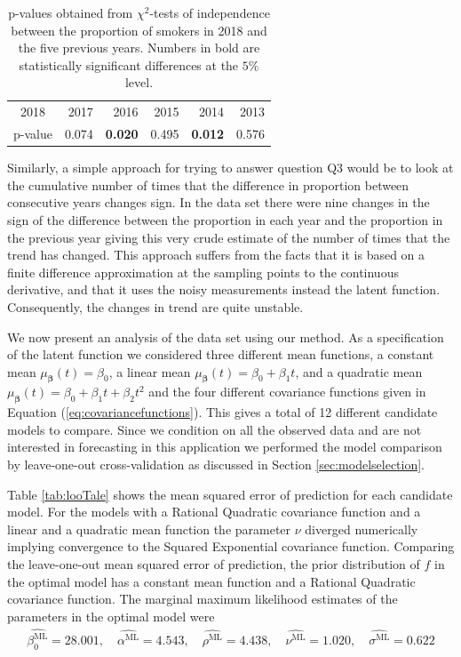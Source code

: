 \documentclass[
  11pt,
]{article}
\theoremstyle{nonumberplain}
\begin{document}
\begin{table}[htbp]
\center
\begin{tabular}{c|rrrrr} \hline
2018 & 2017 & 2016 & 2015 & 2014 & 2013\\ 
p-value & 0.074 & \textbf{0.020} & 0.495 & \textbf{0.012} & 0.576\\ \hline
\end{tabular}
\caption{p-values obtained from $\chi^2$-tests of independence between the proportion of smokers in 2018 and the five previous years. Numbers in bold are statistically significant differences at the $5\%$ level.}
\label{tab:chisqtests}
\end{table}

Similarly, a simple approach for trying to answer question Q3 would be
to look at the cumulative number of times that the difference in
proportion between consecutive years changes sign. In the data set there
were nine changes in the sign of the difference between the proportion
in each year and the proportion in the previous year giving this very
crude estimate of the number of times that the trend has changed. This
approach suffers from the facts that it is based on a finite difference
approximation at the sampling points to the continuous derivative, and
that it uses the noisy measurements instead the latent function.
Consequently, the changes in trend are quite unstable.

We now present an analysis of the data set using our method. As a
specification of the latent function we considered three different mean
functions, a constant mean \(\mu_{\bm{\beta}}(t) = \beta_0\), a linear
mean \(\mu_{\bm{\beta}}(t) = \beta_0 + \beta_1 t\), and a quadratic mean
\(\mu_{\bm{\beta}}(t) = \beta_0 + \beta_1 t + \beta_2 t^2\) and the four
different covariance functions given in Equation
(\ref{eq:covariancefunctions}). This gives a total of 12 different
candidate models to compare. Since we condition on all the observed data
and are not interested in forecasting in this application we performed
the model comparison by leave-one-out cross-validation as discussed in
Section \ref{sec:modelselection}.

Table \ref{tab:looTale} shows the mean squared error of prediction for
each candidate model. For the models with a Rational Quadratic
covariance function and a linear and a quadratic mean function the
parameter \(\nu\) diverged numerically implying convergence to the
Squared Exponential covariance function. Comparing the leave-one-out
mean squared error of prediction, the prior distribution of \(f\) in the
optimal model has a constant mean function and a Rational Quadratic
covariance function. The marginal maximum likelihood estimates of the
parameters in the optimal model were \begin{align}
  \widehat{\beta_0^\text{ML}} = 28.001, \quad \widehat{\alpha^\text{ML}} = 4.543, \quad \widehat{\rho^\text{ML}} = 4.438, \quad \widehat{\nu^\text{ML}} = 1.020, \quad \widehat{\sigma^\text{ML}} = 0.622\label{eq:mlEstimates}
\end{align}
\end{document}
